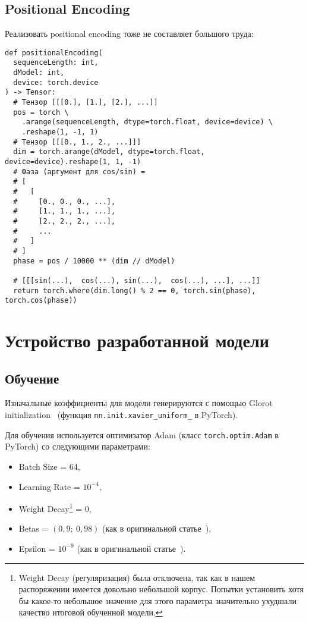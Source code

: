 \subsection{Positional Encoding}


Реализовать positional encoding тоже не составляет большого труда:

\begin{verbatim}
def positionalEncoding(
  sequenceLength: int,
  dModel: int,
  device: torch.device
) -> Tensor:
  # Тензор [[[0.], [1.], [2.], ...]]
  pos = torch \
    .arange(sequenceLength, dtype=torch.float, device=device) \
    .reshape(1, -1, 1)
  # Тензор [[[0., 1., 2., ...]]]
  dim = torch.arange(dModel, dtype=torch.float, device=device).reshape(1, 1, -1)
  # Фаза (аргумент для cos/sin) =
  # [
  #   [
  #     [0., 0., 0., ...],
  #     [1., 1., 1., ...],
  #     [2., 2., 2., ...],
  #     ...
  #   ]
  # ]
  phase = pos / 10000 ** (dim // dModel)

  # [[[sin(...),  cos(...), sin(...),  cos(...), ...], ...]]
  return torch.where(dim.long() % 2 == 0, torch.sin(phase), torch.cos(phase))
\end{verbatim}


\section{Устройство разработанной модели}


\subsection{Обучение}


Изначальные коэффициенты для модели генерируются с помощью Glorot initialization~\cite{Glorot} (функция \texttt{nn.init.xavier\_uniform\_} в PyTorch).

Для обучения используется оптимизатор Adam (класс \texttt{torch.optim.Adam} в PyTorch) со следующими параметрами:
\begin{itemize}%
  \item Batch Size = 64,
  \item Learning Rate = $10^{-4}$,
  \item Weight Decay\footnote{Weight Decay (регуляризация) была отключена, так как в нашем распоряжении имеется довольно небольшой корпус. Попытки установить хотя бы какое-то небольшое значение для этого параметра значительно ухудшали качество итоговой обученной модели.} = 0,
  \item Betas = $(0{,}9;\ 0{,}98)$ (как в оригинальной статье~\cite{vaswani2017attention}),
  \item Epsilon = $10^{-9}$ (как в оригинальной статье~\cite{vaswani2017attention}).
\end{itemize}

